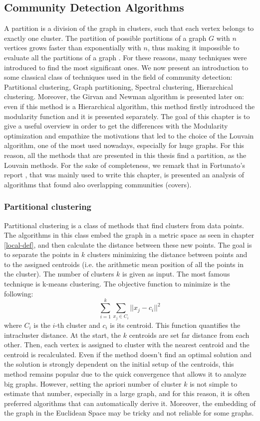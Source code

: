 \subsection{Community Detection Algorithms}
A partition is a division of the graph in clusters, such that each vertex belongs to exactly one cluster. 
The partition of possible partitions of a graph $G$ with $n$ vertices grows faster than exponentially with $n$,  thus making it impossible to evaluate all the partitions of a graph \cite{fortunato}. For these reasons, many techniques were introduced to find the most significant ones.
We now present an introduction to some classical class of techniques used in the field of community detection: Partitional clustering, Graph partitioning, Spectral clustering, Hierarchical clustering.  Moreover, the Girvan and Newman algorithm is presented later on: even if this method is a Hierarchical algorithm, this method firstly introduced the modularity function and it is presented separately. The goal of this chapter is to give a useful overview in order to get the differences with the Modularity optimization and empathize the motivations that led to the choice of the Louvain algorithm, one of the most used nowadays, especially for huge graphs. For this reason, all the methods that are presented in this thesis find a partition, as the Louvain methods. 
For the sake of completeness, we remark that in Fortunato's report \cite{fortunato}, that was mainly used to write this chapter, is presented an analysis of algorithms that found also overlapping communities (covers). 
\subsubsection{Partitional clustering}
Partitional clustering is a class of methods that find clusters from data points. The algorithms in this class embed the graph in a metric space as seen in chapter \ref{local-def}, and then calculate the distance between these new points.  The goal is to separate the points in $k$ clusters minimizing the distance between points and to the assigned centroids (i.e. the arithmetic mean position of all the points in the cluster). The number of clusters $k$ is given as input. The most famous technique is k-means clustering.
The objective function to minimize is the following:
\begin{equation}
\sum^k_{i=1} \sum_{x_j\in C_i} || x_j - c_i ||^2 
\end{equation}
where $C_i$ is the $i$-th cluster and $c_i$ is its centroid. This function quantifies the intracluster distance. 
At the start, the $k$ centroids are set far distance from each other. Then, each vertex is assigned to cluster with the nearest centroid and the centroid is recalculated.  Even if the method doesn't find an optimal solution and the solution is strongly dependent on the initial setup of the centroids, this method remains popular due to the quick convergence that allows it to analyze big graphs.
However, setting the apriori number of cluster $k$ is not simple to estimate that number,
especially in a large graph, and for this reason, it is often preferred algorithms that can automatically derive it. Moreover, the embedding of the graph in the Euclidean Space may be tricky and not reliable for some graphs.
